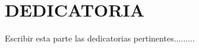 \chapter*{DEDICATORIA}
\renewcommand{\thepage}{\roman{page}}
Escribir esta parte las dedicatorias pertinentes.........